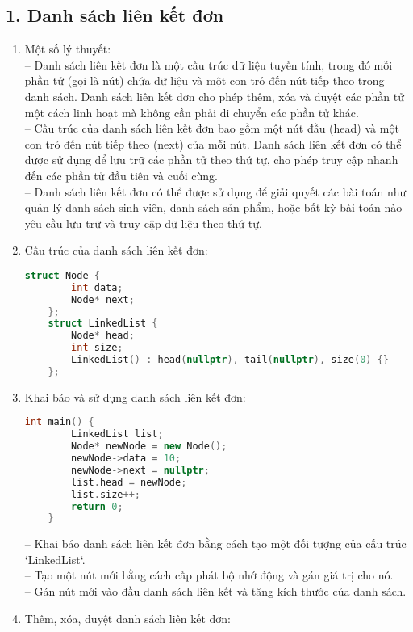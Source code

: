 \subsection*{1. Danh sách liên kết đơn}
\begin{enumerate}[label=\alph*.]
    \item Một số lý thuyết:\\
    -- Danh sách liên kết đơn là một cấu trúc dữ liệu tuyến tính, trong đó mỗi phần tử (gọi là nút) chứa dữ liệu và một con trỏ đến nút tiếp theo trong danh sách. Danh sách liên kết đơn cho phép thêm, xóa và duyệt các phần tử một cách linh hoạt mà không cần phải di chuyển các phần tử khác.\\
    -- Cấu trúc của danh sách liên kết đơn bao gồm một nút đầu (head) và một con trỏ đến nút tiếp theo (next) của mỗi nút. Danh sách liên kết đơn có thể được sử dụng để lưu trữ các phần tử theo thứ tự, cho phép truy cập nhanh đến các phần tử đầu tiên và cuối cùng.\\
    -- Danh sách liên kết đơn có thể được sử dụng để giải quyết các bài toán như quản lý danh sách sinh viên, danh sách sản phẩm, hoặc bất kỳ bài toán nào yêu cầu lưu trữ và truy cập dữ liệu theo thứ tự.
  \item Cấu trúc của danh sách liên kết đơn:
  \begin{lstlisting}[language=C++]
    struct Node {
        int data; 
        Node* next; 
    };
    struct LinkedList {
        Node* head; 
        int size;
        LinkedList() : head(nullptr), tail(nullptr), size(0) {} 
    };
  \end{lstlisting}
  \vspace{-4.em}
  \item Khai báo và sử dụng danh sách liên kết đơn:
  \begin{lstlisting}[language=C++]
    int main() {
        LinkedList list;
        Node* newNode = new Node(); 
        newNode->data = 10; 
        newNode->next = nullptr; 
        list.head = newNode; 
        list.size++;
        return 0;
    }
  \end{lstlisting}
    \vspace{-4.em}
  -- Khai báo danh sách liên kết đơn bằng cách tạo một đối tượng của cấu trúc `LinkedList`.\\
  -- Tạo một nút mới bằng cách cấp phát bộ nhớ động và gán giá trị cho nó.\\
  -- Gán nút mới vào đầu danh sách liên kết và tăng kích thước của danh sách.
  \item Thêm, xóa, duyệt danh sách liên kết đơn:

\end{enumerate}

